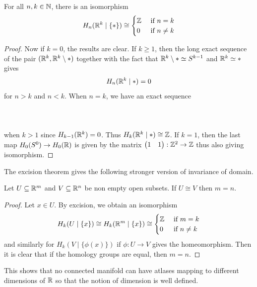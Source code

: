 \documentclass[a4paper]{article}
\begin{document}
\begin{prp}{}{} For all $n,k\in\mathbb{N}$, there is an isomorphism $$H_n(\mathbb{R}^k\;|\;\{\ast\})\cong\begin{cases}
\mathbb{Z} & \text{ if } n=k\\
0 & \text{ if } n\neq k
\end{cases}$$ \tcbline
\begin{proof}
Now if $k=0$, the results are clear. If $k\geq 1$, then the long exact sequence of the pair $(\mathbb{R}^k,\mathbb{R}^k\setminus\ast)$ together with the fact that $\mathbb{R}^k\setminus\ast\simeq S^{k-1}$ and $\mathbb{R}^k\simeq\ast$ gives $$H_n(\mathbb{R}^k\;|\;\ast)=0$$ for $n>k$ and $n<k$. When $n=k$, we have an exact sequence \\~\\
\\~\\
when $k>1$ since $H_{k-1}(\mathbb{R}^k)=0$. Thus $H_k(\mathbb{R}^k\;|\;\ast)\cong\mathbb{Z}$. If $k=1$, then the last map $H_0(S^0)\to H_0(\mathbb{R})$ is given by the matrix $\begin{pmatrix}
1 & 1
\end{pmatrix}:\mathbb{Z}^2\to\mathbb{Z}$ thus also giving isomorphism. 
\end{proof}
\end{prp}

The excision theorem gives the following stronger version of invariance of domain. 

\begin{crl}{}{} Let $U\subseteq\mathbb{R}^m$ and $V\subseteq\mathbb{R}^n$ be non empty open subsets. If $U\cong V$ then $m=n$. \tcbline
\begin{proof}
Let $x\in U$. By excision, we obtain an isomorphism $$H_k(U\;|\;\{x\})\cong H_k(\mathbb{R}^m\;|\;\{x\})\cong\begin{cases}
\mathbb{Z} & \text{ if } m=k\\
0 & \text{ if } n\neq k
\end{cases}$$ and similarly for $H_k(V\;|\;\{\phi(x)\})$ if $\phi:U\to V$ gives the homeomorphism. Then it is clear that if the homology groups are equal, then $m=n$. 
\end{proof}
\end{crl}

This shows that no connected manifold can have atlases mapping to different dimensions of $\mathbb{R}$ so that the notion of dimension is well defined. 
\end{document}
